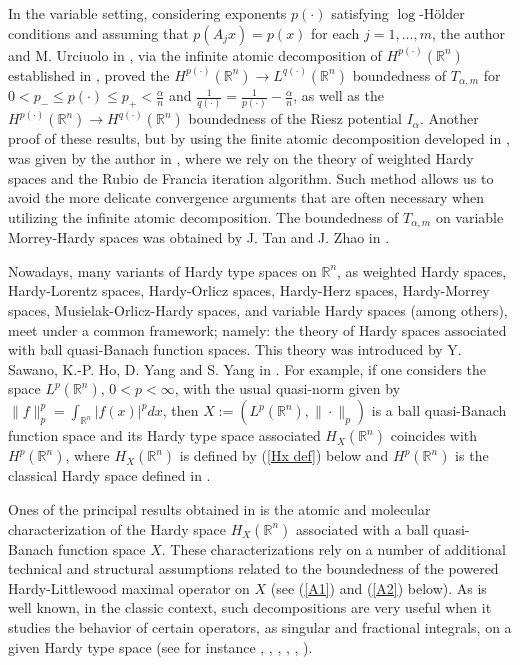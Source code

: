 \documentclass[oneside,10pt]{article}
\begin{document}
In the variable setting, considering exponents $p(\cdot)$ satisfying $\log$-H\"older conditions and assuming that $p(A_j x) = p(x)$ for 
each $j=1, ..., m$, the author and M. Urciuolo in \cite{Ro-Urc}, via the infinite atomic decomposition of $H^{p(\cdot)}(\mathbb{R}^n)$ established in \cite{Nakai}, proved the $H^{p(\cdot)}(\mathbb{R}^n) \to L^{q(\cdot)}(\mathbb{R}^n)$ boundedness of $T_{\alpha, m}$ for 
$0 < p_{-} \leq p(\cdot) \leq p_{+} < \frac{\alpha}{n}$ and $\frac{1}{q(\cdot)} = \frac{1}{p(\cdot)} - \frac{\alpha}{n}$, as well as the 
$H^{p(\cdot)}(\mathbb{R}^n) \to H^{q(\cdot)}(\mathbb{R}^n)$ boundedness of the Riesz potential $I_{\alpha}$. Another proof of these results, but by using the finite atomic decomposition developed in \cite{UrWang}, was given by the author in \cite{Rocha2018}, where we rely on
the theory of weighted Hardy spaces and the Rubio de Francia iteration algorithm. Such method allows us to avoid the more delicate convergence arguments that are often necessary when utilizing the infinite atomic decomposition. The boundedness of 
$T_{\alpha, m}$ on variable Morrey-Hardy spaces was obtained by J. Tan and J. Zhao in \cite{Tan2016}. 

Nowadays, many variants of Hardy type spaces on $\mathbb{R}^n$, as weighted Hardy spaces, Hardy-Lorentz spaces, Hardy-Orlicz spaces, 
Hardy-Herz spaces, Hardy-Morrey spaces, Musielak-Orlicz-Hardy spaces, and variable Hardy spaces (among others), meet under a common framework; namely: the theory of Hardy spaces associated with ball quasi-Banach function spaces. This theory was introduced by Y. Sawano, K.-P. Ho, D. Yang and S. Yang in \cite{sawa}. For example, if one considers the space 
$L^{p}(\mathbb{R}^n)$, $0 < p < \infty$, with the usual quasi-norm given by $\| f \|_{p}^p = \int_{\mathbb{R}^n} |f(x)|^p dx$, then 
$X:=(L^{p}(\mathbb{R}^n), \| \cdot \|_{p})$ is a ball quasi-Banach function space and its Hardy type space associated 
$H_X (\mathbb{R}^n)$ coincides with $H^p(\mathbb{R}^n)$, where $H_X (\mathbb{R}^n)$ is defined by (\ref{Hx def}) below and 
$H^p(\mathbb{R}^n)$ is the classical Hardy space defined in \cite{Stein}. 

Ones of the principal results obtained in \cite{sawa} is the atomic and molecular characterization of the Hardy space $H_X (\mathbb{R}^n)$ associated with a ball quasi-Banach function space $X$. These characterizations rely on a number of additional technical and structural assumptions related to the boundedness of the powered Hardy-Littlewood maximal operator on $X$ (see (\ref{A1}) and (\ref{A2}) below). As is well known, in the classic context, such decompositions are very useful when it studies the behavior of certain operators, as singular and fractional integrals, on a given Hardy type space (see for instance \cite{cuerva}, \cite{Nakai}, \cite{Ro-Urc}, \cite{Stein}, 
\cite{wheeden}, \cite{Taible}). 
\end{document}
